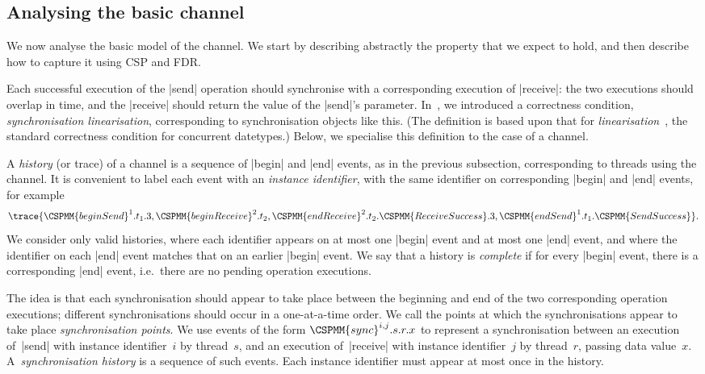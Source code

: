 \inlineCSP

\subsection{Analysing the basic channel}
\label{sec:syncchan-analysis-1}

We now analyse the basic model of the channel.  We start by describing
abstractly the property that we expect to hold, and then describe how to
capture it using CSP and FDR.

Each successful execution of the |send| operation should synchronise with a
corresponding execution of |receive|: the two executions should overlap in
time, and the |receive| should return the value of the |send|'s parameter.
In~\cite{LL:synchronisation}, we introduced a correctness condition,
\emph{synchronisation linearisation}, corresponding to synchronisation objects
like this.  (The definition is based upon that for
\emph{linearisation}~\cite{herlihy-wing}, the standard correctness condition
for concurrent datetypes.)  Below, we specialise this definition to the case
of a channel.

A \emph{history} (or trace) of a channel is a sequence of |begin| and |end|
events, as in the previous subsection, corresponding to threads using the
channel.  It is convenient to label each event with an \emph{instance
  identifier}, with the same identifier on corresponding |begin| and |end|
events, for example
\[
\trace{\CSPMM{beginSend}^1.t_1.3, \CSPMM{beginReceive}^2.t_2,
  \CSPMM{endReceive}^2.t_2.\CSPMM{ReceiveSuccess}.3, 
  \CSPMM{endSend}^1.t_1.\CSPMM{SendSuccess} }.
\]
We consider only valid histories, where each identifier appears on at most one
|begin| event and at most one |end| event, and where the identifier on each
|end| event matches that on an earlier |begin| event.  We say that a history
is \emph{complete} if for every |begin| event, there is a corresponding |end|
event, i.e.~there are no pending operation executions.

The idea is that each synchronisation should appear to take place between the
beginning and end of the two corresponding operation executions; different
synchronisations should occur in a one-at-a-time order.  We call the points at
which the synchronisations appear to take place \emph{synchronisation points}.
%
We use events of the form $\CSPMM{sync}^{i,j}.s.r.x$ to represent a
synchronisation between an execution of~|send| with instance identifier~$i$ by
thread~$s$, and an execution of~|receive| with instance identifier~$j$ by
thread~$r$, passing data value~$x$.
%
A~\emph{synchronisation history} is a sequence of such  events.
Each instance identifier must appear at most once in the history. 

